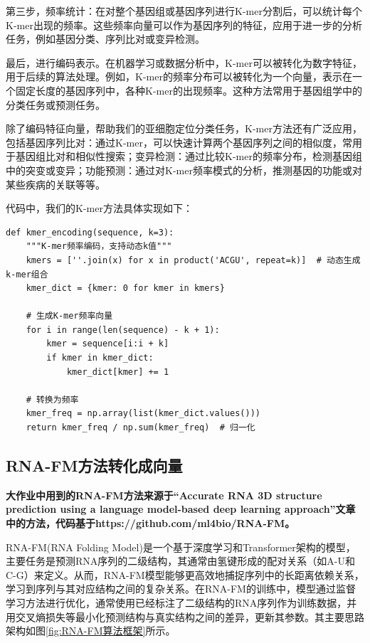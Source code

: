 \documentclass[a4paper,11pt,AutoFakeBold]{ctexart}
\begin{document}
第三步，频率统计：在对整个基因组或基因序列进行K-mer分割后，可以统计每个K-mer出现的频率。这些频率向量可以作为基因序列的特征，应用于进一步的分析任务，例如基因分类、序列比对或变异检测。

最后，进行编码表示。在机器学习或数据分析中，K-mer可以被转化为数字特征，用于后续的算法处理。例如，K-mer的频率分布可以被转化为一个向量，表示在一个固定长度的基因序列中，各种K-mer的出现频率。这种方法常用于基因组学中的分类任务或预测任务。

除了编码特征向量，帮助我们的亚细胞定位分类任务，K-mer方法还有广泛应用，包括基因序列比对：通过K-mer，可以快速计算两个基因序列之间的相似度，常用于基因组比对和相似性搜索；变异检测：通过比较K-mer的频率分布，检测基因组中的突变或变异；功能预测：通过对K-mer频率模式的分析，推测基因的功能或对某些疾病的关联等等。

代码中，我们的K-mer方法具体实现如下：
\begin{lstlisting}
def kmer_encoding(sequence, k=3):
    """K-mer频率编码，支持动态k值"""
    kmers = [''.join(x) for x in product('ACGU', repeat=k)]  # 动态生成k-mer组合
    kmer_dict = {kmer: 0 for kmer in kmers}
    
    # 生成K-mer频率向量
    for i in range(len(sequence) - k + 1):
        kmer = sequence[i:i + k]
        if kmer in kmer_dict:
            kmer_dict[kmer] += 1
    
    # 转换为频率
    kmer_freq = np.array(list(kmer_dict.values()))
    return kmer_freq / np.sum(kmer_freq)  # 归一化
\end{lstlisting}


\subsection{RNA-FM方法转化成向量}
\textbf{大作业中用到的RNA-FM方法来源于“Accurate RNA 3D structure prediction using a language model-based deep learning approach”文章中的方法，代码基于https://github.com/ml4bio/RNA-FM。}

RNA-FM(RNA Folding Model)是一个基于深度学习和Transformer架构的模型，主要任务是预测RNA序列的二级结构，其通常由氢键形成的配对关系（如A-U和C-G）来定义。从而，RNA-FM模型能够更高效地捕捉序列中的长距离依赖关系，学习到序列与其对应结构之间的复杂关系。在RNA-FM的训练中，模型通过监督学习方法进行优化，通常使用已经标注了二级结构的RNA序列作为训练数据，并用交叉熵损失等最小化预测结构与真实结构之间的差异，更新其参数。其主要思路架构如图\ref{fig:RNA-FM算法框架}所示。
\end{document}
